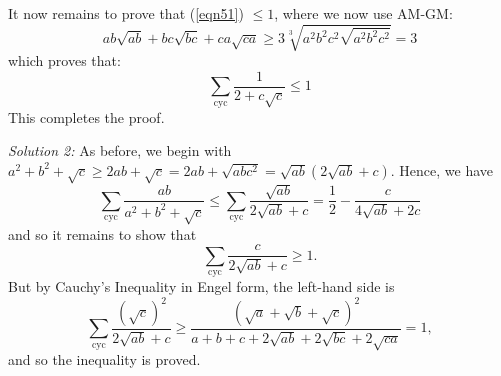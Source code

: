 \documentclass[a4paper, 12pt]{article}
\begin{document}
\begin{enumerate}
    It now remains to prove that (\ref{eqn51}) $ \leq 1$, where we now use AM-GM:
    $$  ab\sqrt {ab} + bc\sqrt {bc} + ca\sqrt {ca} \geq 3 \sqrt [3]{a^2b^2c^2\sqrt {a^2b^2c^2}} = 3 $$
    which proves that:
    $$ \sum_\textrm{cyc} \frac{1}{2 + c\sqrt{c}} \leq 1 $$
    This completes the proof.
    
	  \emph{Solution 2:} As before, we begin with $a^2 + b^2 + \sqrt{c} \geq 2ab + \sqrt{c} = 2ab + \sqrt{abc^2} = \sqrt{ab}\left(2\sqrt{ab}+c\right)$. Hence, we have
	    \[ \sum_\textrm{cyc} \frac {ab}{a^2 + b^2 + \sqrt {c}} \leq \sum_\textrm{cyc} \frac{\sqrt{ab}}{2\sqrt{ab}+c} = \frac{1}{2} - \frac{c}{4\sqrt{ab}+2c} \]
	  and so it remains to show that
	    \[ \sum_\textrm{cyc} \frac{c}{2\sqrt{ab}+c} \geq 1. \]
	  But by Cauchy's Inequality in Engel form, the left-hand side is
	    \[ \sum_\textrm{cyc} \frac{(\sqrt{c})^2}{2\sqrt{ab}+c} \geq \frac{\left(\sqrt{a}+\sqrt{b}+\sqrt{c}\right)^2}{a+b+c+2\sqrt{ab}+2\sqrt{bc}+2\sqrt{ca}} = 1, \]
	  and so the inequality is proved.
\end{enumerate}
\end{document}

